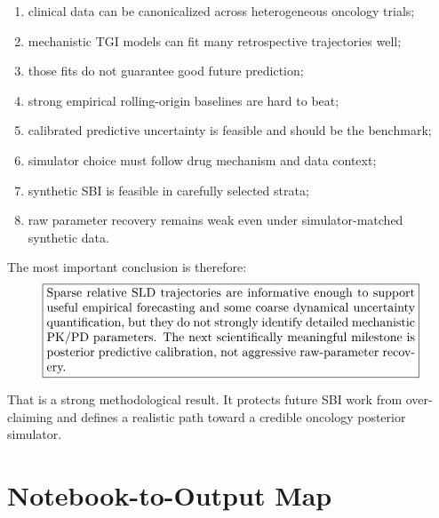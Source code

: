 \documentclass[11pt,a4paper]{article}
\newcommand{\sld}{\ensuremath{\mathrm{SLD}}}
\begin{document}
\begin{enumerate}[leftmargin=2em]
    \item clinical data can be canonicalized across heterogeneous oncology trials;
    \item mechanistic TGI models can fit many retrospective trajectories well;
    \item those fits do not guarantee good future prediction;
    \item strong empirical rolling-origin baselines are hard to beat;
    \item calibrated predictive uncertainty is feasible and should be the benchmark;
    \item simulator choice must follow drug mechanism and data context;
    \item synthetic SBI is feasible in carefully selected strata;
    \item raw parameter recovery remains weak even under simulator-matched synthetic data.
\end{enumerate}

The most important conclusion is therefore:
\[
\boxed{
\begin{minipage}{0.86\textwidth}
Sparse relative \sld{} trajectories are informative enough to support useful empirical forecasting and some coarse dynamical uncertainty quantification, but they do not strongly identify detailed mechanistic PK/PD parameters. The next scientifically meaningful milestone is posterior predictive calibration, not aggressive raw-parameter recovery.
\end{minipage}
}
\]

That is a strong methodological result. It protects future SBI work from over-claiming and defines a realistic path toward a credible oncology posterior simulator.

\appendix

\section{Notebook-to-Output Map}
\end{document}
